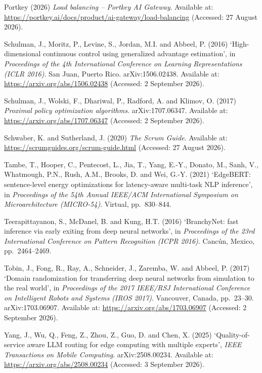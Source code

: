 \begin{list}{}{\setlength{\leftmargin}{1.5em}\setlength{\itemindent}{-1.5em}\setlength{\itemsep}{0.6em}\setlength{\parsep}{0pt}}
\item Portkey (2026) \emph{Load balancing -- Portkey AI Gateway}. Available at: \url{https://portkey.ai/docs/product/ai-gateway/load-balancing} (Accessed: 27 August 2026).

\item Schulman, J., Moritz, P., Levine, S., Jordan, M.I. and Abbeel, P. (2016) `High-dimensional continuous control using generalized advantage estimation', in \emph{Proceedings of the 4th International Conference on Learning Representations (ICLR 2016)}. San Juan, Puerto Rico. arXiv:1506.02438. Available at: \url{https://arxiv.org/abs/1506.02438} (Accessed: 2 September 2026).

\item Schulman, J., Wolski, F., Dhariwal, P., Radford, A. and Klimov, O. (2017) \emph{Proximal policy optimization algorithms}. arXiv:1707.06347. Available at: \url{https://arxiv.org/abs/1707.06347} (Accessed: 2 September 2026).

\item Schwaber, K. and Sutherland, J. (2020) \emph{The Scrum Guide}. Available at: \url{https://scrumguides.org/scrum-guide.html} (Accessed: 27 August 2026).

\item Tambe, T., Hooper, C., Pentecost, L., Jia, T., Yang, E.-Y., Donato, M., Sanh, V., Whatmough, P.N., Rush, A.M., Brooks, D. and Wei, G.-Y. (2021) `EdgeBERT: sentence-level energy optimizations for latency-aware multi-task NLP inference', in \emph{Proceedings of the 54th Annual IEEE/ACM International Symposium on Microarchitecture (MICRO-54)}. Virtual, pp.~830--844.

\item Teerapittayanon, S., McDanel, B. and Kung, H.T. (2016) `BranchyNet: fast inference via early exiting from deep neural networks', in \emph{Proceedings of the 23rd International Conference on Pattern Recognition (ICPR 2016)}. Canc\'un, Mexico, pp.~2464--2469.

\item Tobin, J., Fong, R., Ray, A., Schneider, J., Zaremba, W. and Abbeel, P. (2017) `Domain randomization for transferring deep neural networks from simulation to the real world', in \emph{Proceedings of the 2017 IEEE/RSJ International Conference on Intelligent Robots and Systems (IROS 2017)}. Vancouver, Canada, pp.~23--30. arXiv:1703.06907. Available at: \url{https://arxiv.org/abs/1703.06907} (Accessed: 2 September 2026).

\item Yang, J., Wu, Q., Feng, Z., Zhou, Z., Guo, D. and Chen, X. (2025) `Quality-of-service aware LLM routing for edge computing with multiple experts', \emph{IEEE Transactions on Mobile Computing}. arXiv:2508.00234. Available at: \url{https://arxiv.org/abs/2508.00234} (Accessed: 3 September 2026).


\end{list}
